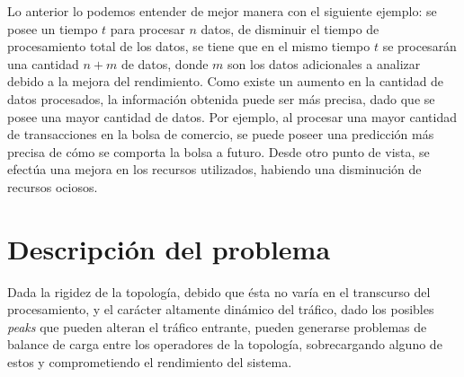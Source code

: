 Lo anterior lo podemos entender de mejor manera con el siguiente ejemplo: se posee un tiempo $t$ para procesar $n$ datos, de disminuir el tiempo de procesamiento total de los datos, se tiene que en el mismo tiempo $t$ se procesarán una cantidad $n+m$ de datos, donde $m$ son los datos adicionales a analizar debido a la mejora del rendimiento. Como existe un aumento en la cantidad de datos procesados, la información obtenida puede ser más precisa, dado que se posee una mayor cantidad de datos. Por ejemplo, al procesar una mayor cantidad de transacciones en la bolsa de comercio, se puede poseer una predicción más precisa de cómo se comporta la bolsa a futuro. Desde otro punto de vista, se efectúa una mejora en los recursos utilizados, habiendo una disminución de recursos ociosos.

\section{Descripción del problema}
\label{intro:problema}




Dada la rigidez de la topología, debido que ésta no varía en el transcurso del procesamiento, y el carácter altamente dinámico del tráfico, dado los posibles \textit{peaks} que pueden alteran el tráfico entrante, pueden generarse problemas de balance de carga entre los operadores de la topología, sobrecargando alguno de estos y comprometiendo el rendimiento del sistema.

